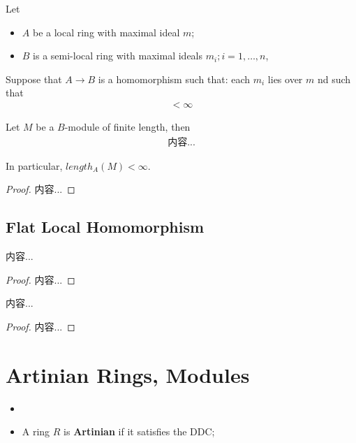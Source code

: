 \documentclass[Total.tex]{subfiles}
\begin{document}
		\begin{lemma}
			Let
			\begin{itemize}
				\item  $A$ be a local ring with maximal ideal $m$;
				\item $B$ is a semi-local ring with maximal ideals $m_i;i=1,\dots,n$, 
			\end{itemize}
			
			Suppose that $A\rightarrow B$ is a homomorphism such that: each $m_i$ lies over $m$ nd such that
			\begin{gather*}
				[\kappa(m_i):\kappa(m)]<\infty
			\end{gather*}
			
			Let $M$ be a $B$-module of finite length, then
			\begin{gather*}
				内容...
			\end{gather*}
			
			In particular, $length_A(M)<\infty$.
		\end{lemma}
		\begin{proof}
			内容...
		\end{proof}
		
		\subsection{Flat Local Homomorphism}
		
		\begin{lemma}
			内容...
		\end{lemma}
		\begin{proof}
			内容...
		\end{proof}
		
		\begin{lemma}
			内容...
		\end{lemma}
		\begin{proof}
			内容...
		\end{proof}
		\section{Artinian Rings, Modules}
		
			\begin{Def}
				\begin{itemize}
					\item 
					\item A ring $R$ is \textbf{Artinian} if it satisfies the DDC;
				\end{itemize}
			\end{Def}
\end{document}
